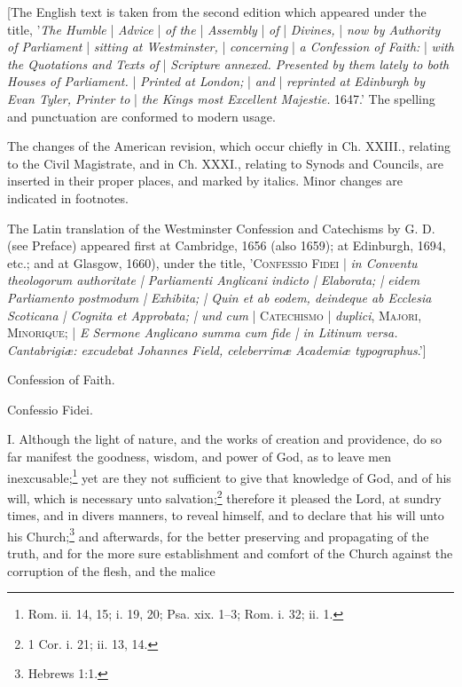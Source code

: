 
[The English text is taken from the second edition which appeared under the title, '\emph{The Humble} | \emph{Advice} | \emph{of the} | \emph{Assembly} | \emph{of} | \emph{Divines,} | \emph{now by Authority of Parliament} | \emph{sitting at Westminster,} | \emph{concerning }| \emph{a Confession of Faith:} | \emph{with the Quotations and Texts of} | \emph{Scripture annexed. Presented by them lately to both Houses of Parliament.} | \emph{Printed at London;} | \emph{and} | \emph{reprinted at Edinburgh by Evan Tyler, Printer to} | \emph{the Kings most Excellent Majestie.} 1647.' The spelling and punctuation are conformed to modern usage.

The changes of the American revision, which occur chiefly in Ch. XXIII., relating to the Civil Magistrate, and in Ch. XXXI., relating to Synods and Councils, are inserted in their proper places, and marked by italics. Minor changes are indicated in footnotes.

The Latin translation of the Westminster Confession and Catechisms by G. D. (see Preface) appeared first at Cambridge, 1656 (also 1659); at Edinburgh, 1694, etc.; and at Glasgow, 1660), under the title, 'C\textsc{onfessio} F\textsc{idei} | \emph{in Conventu theologorum authoritate | Parliamenti Anglicani indicto | Elaborata; | eidem Parliamento postmodum | Exhibita; | Quin et ab eodem, deindeque ab Ecclesia Scoticana | Cognita et Approbata; | und cum} | C\textsc{atechismo} | \emph{duplici}, M\textsc{ajori}, M\textsc{inorique}; | \emph{E Sermone Anglicano summa cum fide | in Litinum versa. Cantabrigiæ: excudebat Johannes Field, celeberrimæ Academiæ typographus}.']

Confession of Faith.

Confessio Fidei.


I. Although the light of nature, and the works of creation and providence, do so far manifest the goodness, wisdom, and power of God, as to leave men inexcusable;\footnote{Rom. ii. 14, 15; i. 19, 20;  Psa. xix. 1–3; Rom. i. 32;  ii. 1.} yet are they not sufficient to give that knowledge of God, and of his will, which is necessary unto salvation;\footnote{1 Cor. i. 21; ii. 13, 14.} therefore it pleased the Lord, at sundry times, and in divers manners, to reveal himself, and to declare that his will unto his Church;\footnote{Hebrews 1:1.} and afterwards, for the better preserving and propagating of the truth, and for the more sure establishment and comfort of the Church against the corruption of the flesh, and the malice

